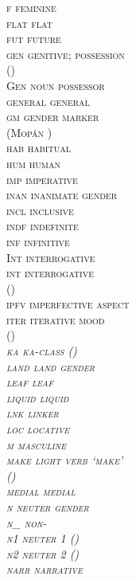 \documentclass[output=collectionpaper]{langsci/langscibook}
\begin{document}
\begin{multicols}{2}
\begin{tabbing}
\scshape f	\>	feminine	\\
\scshape flat	\>	flat	\\
\scshape fut	\>	future	\\
\scshape gen	\>	genitive; possession \\ \> ()	\\
\normalfont Gen	\>	noun possessor	\\
\scshape general	\>	general	\\
\scshape gm	\>	gender marker\\ \> (Mopán )	\\
\scshape hab	\>	habitual	\\
\scshape hum	\>	human	\\
\scshape imp	\>	imperative	\\
\scshape inan	\>	inanimate gender	\\
\scshape incl	\>	inclusive	\\
\scshape indf	\>	indefinite	\\
\scshape inf	\>	infinitive	\\
\scshape Int	\>	interrogative	\\
\scshape int	\>	interrogative \\ \> ()	\\
\scshape ipfv	\>	imperfective aspect	\\
\scshape iter	\>	iterative mood \\ \> ()	\\
\scshape \itshape ka	\>	\textit{ka}-class ()	\\
\scshape land	\>	land gender	\\
\scshape leaf	\>	leaf	\\
\scshape liquid	\>	liquid	\\
\scshape lnk	\>	linker	\\
\scshape loc	\>	locative	\\
\scshape m	\>	masculine	\\
\scshape make	\>	light verb `make'\\ \> ()	\\
\scshape medial	\>	medial	\\
\scshape n	\>	neuter gender	\\
\scshape n\_	\>	non-	\\
\scshape n1	\>	neuter 1 ()	\\
\scshape n2	\>	neuter 2 ()	\\
\scshape narr	\>	narrative	\\

\end{tabbing}
\end{multicols}
\end{document}
